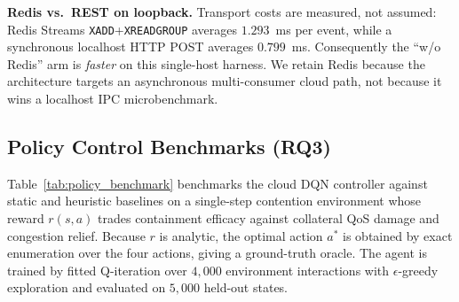 \documentclass[conference,a4paper]{IEEEtran}
\begin{document}
\textbf{Redis vs.\ REST on loopback.} Transport costs are measured, not assumed: Redis Streams \texttt{XADD}+\texttt{XREADGROUP} averages $1.293$~ms per event, while a synchronous localhost HTTP POST averages $0.799$~ms. Consequently the ``w/o Redis'' arm is \emph{faster} on this single-host harness. We retain Redis because the architecture targets an asynchronous multi-consumer cloud path, not because it wins a localhost IPC microbenchmark.

\begin{table}[htbp]
\caption{System Component Ablation Analysis ($\rho = 0.7$, threshold tuned on train). Latencies include measured Redis or REST transport; only within-table comparison is meaningful.}
\label{tab:ablation}
\begin{center}
\end{center}
\end{table}

\subsection{Policy Control Benchmarks (RQ3)}
Table~\ref{tab:policy_benchmark} benchmarks the cloud DQN controller against static and heuristic baselines on a single-step contention environment whose reward $r(s,a)$ trades containment efficacy against collateral QoS damage and congestion relief. Because $r$ is analytic, the optimal action $a^*$ is obtained by exact enumeration over the four actions, giving a ground-truth oracle. The agent is trained by fitted Q-iteration over $4{,}000$ environment interactions with $\epsilon$-greedy exploration and evaluated on $5{,}000$ held-out states.
\end{document}
